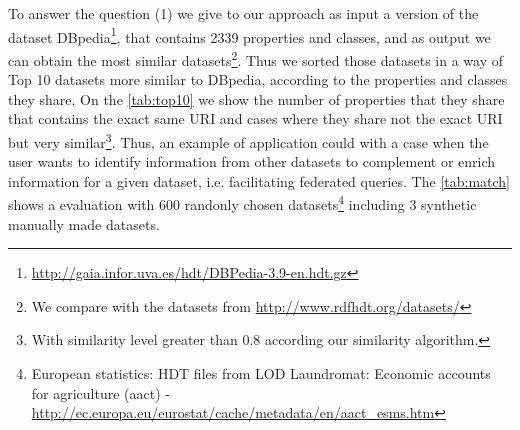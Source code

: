 \documentclass[sw]{iosart2x}
\begin{document}

To answer the question (1) we give to our approach as input a version of the dataset DBpedia\footnote{\url{http://gaia.infor.uva.es/hdt/DBPedia-3.9-en.hdt.gz}}, that contains \num{2339} properties and classes, and as output we can obtain the most similar datasets\footnote{We compare with the datasets from \url{http://www.rdfhdt.org/datasets/}}. Thus we sorted those datasets in a way of Top 10 datasets more similar to DBpedia, according to the properties and classes they share. On the \cref{tab:top10} we show the number of properties that they share that contains the exact same URI and cases where they share not the exact URI but very similar\footnote{With similarity level greater than 0.8 according our similarity algorithm.}. Thus, an example of application could with a case when the user wants to identify information from other datasets to complement or enrich information for a given dataset, i.e. facilitating federated queries. The \cref{tab:match} shows a evaluation with 600 randonly chosen datasets\footnote{European statistics: HDT files from LOD Laundromat: Economic accounts for agriculture (aact) - \url{http://ec.europa.eu/eurostat/cache/metadata/en/aact_esms.htm}} including 3 synthetic manually made datasets.
\end{document}
